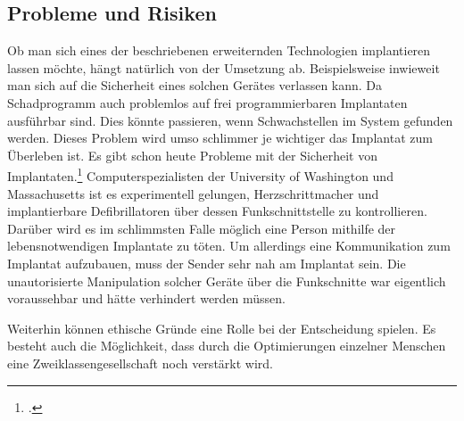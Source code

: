 \subsection{Probleme und Risiken}
\label{sec:Robin:future:problems}
Ob man sich eines der beschriebenen erweiternden Technologien implantieren lassen möchte, hängt
natürlich von der Umsetzung ab. Beispielsweise inwieweit man sich auf die Sicherheit eines solchen
Gerätes verlassen kann. Da Schadprogramm auch problemlos auf frei programmierbaren Implantaten
ausführbar sind. Dies könnte passieren, wenn Schwachstellen im System gefunden werden. Dieses Problem
wird umso schlimmer je wichtiger das Implantat zum Überleben ist. Es gibt schon heute Probleme mit
der Sicherheit von Implantaten.\footcite{Heise:Pacemaker_Hacker, MIT:Protect_implants_from_attack}
Computerspezialisten der University of Washington und Massachusetts ist es experimentell gelungen,
Herzschrittmacher und implantierbare Defibrillatoren über dessen Funkschnittstelle zu kontrollieren.
Darüber wird es im schlimmsten Falle möglich eine Person mithilfe der lebensnotwendigen Implantate zu
töten. Um allerdings eine Kommunikation zum Implantat aufzubauen, muss der Sender sehr nah am
Implantat sein.
Die unautorisierte Manipulation solcher Geräte über die Funkschnitte war eigentlich voraussehbar und
hätte verhindert werden müssen.

Weiterhin können ethische Gründe eine Rolle bei der Entscheidung spielen. Es besteht auch die
Möglichkeit, dass durch die Optimierungen einzelner Menschen eine Zweiklassengesellschaft noch
verstärkt wird.
